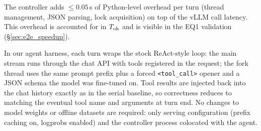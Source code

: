 The controller adds $\leq 0.05$\,s of Python-level overhead per turn (thread
management, JSON parsing, lock acquisition) on top of the vLLM call latency.
This overhead is accounted for in $T_{\mathrm{oh}}$ and is visible in the EQ1 validation
(\S\ref{sec:e2e_speedup}).

In our agent harness, each turn wraps the stock ReAct-style loop: the main stream runs
through the chat API with tools registered in the request; the fork thread uses the same
prompt prefix plus a forced \texttt{<tool\_call>} opener and a JSON schema the model was
fine-tuned on.
Tool results are injected back into the chat history exactly as in the serial baseline, so
correctness reduces to matching the eventual tool name and arguments at turn end.
No changes to model weights or offline datasets are required: only serving configuration
(prefix caching on, logprobs enabled) and the controller process colocated with the agent.
